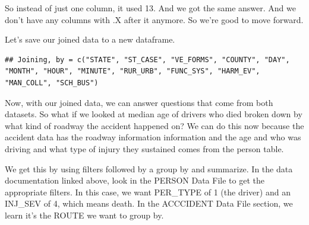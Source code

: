 \documentclass[]{book}
\newenvironment{Shaded}{\begin{snugshade}}{\end{snugshade}}
\newcommand{\DataTypeTok}[1]{\textcolor[rgb]{0.13,0.29,0.53}{#1}}
\newcommand{\DecValTok}[1]{\textcolor[rgb]{0.00,0.00,0.81}{#1}}
\newcommand{\KeywordTok}[1]{\textcolor[rgb]{0.13,0.29,0.53}{\textbf{#1}}}
\newcommand{\NormalTok}[1]{#1}
\newcommand{\OperatorTok}[1]{\textcolor[rgb]{0.81,0.36,0.00}{\textbf{#1}}}
\newcommand{\StringTok}[1]{\textcolor[rgb]{0.31,0.60,0.02}{#1}}
\begin{document}
So instead of just one column, it used 13. And we got the same answer. And we don't have any columns with .X after it anymore. So we're good to move forward.

Let's save our joined data to a new dataframe.

\begin{Shaded}
\end{Shaded}

\begin{verbatim}
## Joining, by = c("STATE", "ST_CASE", "VE_FORMS", "COUNTY", "DAY", "MONTH", "HOUR", "MINUTE", "RUR_URB", "FUNC_SYS", "HARM_EV", "MAN_COLL", "SCH_BUS")
\end{verbatim}

Now, with our joined data, we can answer questions that come from both datasets. So what if we looked at median age of drivers who died broken down by what kind of roadway the accident happened on?
We can do this now because the accident data has the roadway information information and the age and who was driving and what type of injury they sustained comes from the person table.

We get this by using filters followed by a group by and summarize. In the data documentation linked above, look in the PERSON Data File to get the appropriate filters. In this case, we want PER\_TYPE of 1 (the driver) and an INJ\_SEV of 4, which means death. In the ACCCIDENT Data File section, we learn it's the ROUTE we want to group by.

\begin{Shaded}
\end{Shaded}
\end{document}
